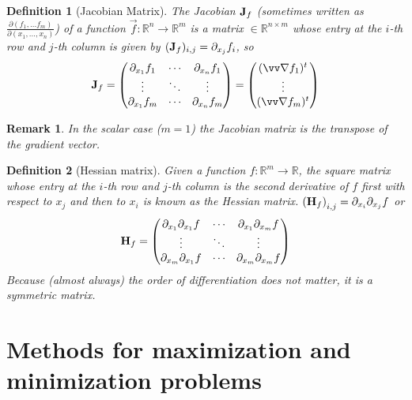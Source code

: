 \documentclass[twocolumn, margin=small]{tex/hsrzf}
\theoremstyle{fuvarzf}
\newtheorem{definition}{Definition}
\newtheorem{remark}{Remark}
\begin{document}
\begin{definition}[Jacobian Matrix]
  The \emph{Jacobian} \(\bm{\mathrm{J}}_f\) (sometimes written as
  \(\frac{\partial(f_1,\ldots f_m)}{\partial(x_1,\ldots,x_n)}\)) of a function
  \(\vec{f}: \mathbb{R}^n \to \mathbb{R}^m\) is a matrix
  \(\in\mathbb{R}^{n\times m}\) whose entry at the \(i\)-th row and \(j\)-th
  column is given by \((\bm{\mathrm{J}}_f)_{i,j} = \partial_{x_j} f_i\), so
  \[
    \mx{J}_f = \begin{pmatrix}
      \partial_{x_1} f_1 & \cdots & \partial_{x_n} f_1 \\
      \vdots & \ddots & \vdots \\
      \partial_{x_1} f_m & \cdots & \partial_{x_n} f_m \\
    \end{pmatrix}
    = \begin{pmatrix}
      (\grad f_1)^t \\
      \vdots \\
      (\grad f_m)^t \\
    \end{pmatrix}
  \]
\end{definition}

\begin{remark}
  In the scalar case (\(m = 1\)) the Jacobian matrix is the transpose of the
  gradient vector.
\end{remark}

\begin{definition}[Hessian matrix]
  Given a function \(f: \mathbb{R}^m \to \mathbb{R}\), the square matrix whose
  entry at the \(i\)-th row and \(j\)-th column is the second derivative of
  \(f\) first with respect to \(x_j\) and then to \(x_i\) is known as the
  \emph{Hessian} matrix.
  \(
    \left(\bm{\mathrm{H}}_f\right)_{i,j} = \partial_{x_i}\partial_{x_j} f
  \)
  or
  \[
    \bm{\mathrm{H}}_f = \begin{pmatrix}
      \partial_{x_1}\partial_{x_1} f & \cdots & \partial_{x_1}\partial_{x_m} f \\
      \vdots & \ddots & \vdots \\
      \partial_{x_m}\partial_{x_1} f & \cdots & \partial_{x_m}\partial_{x_m} f \\
    \end{pmatrix}
  \]
  Because (almost always) the order of differentiation
  does not matter, it is a symmetric matrix.
\end{definition}


\section{Methods for maximization and minimization problems}
\end{document}
